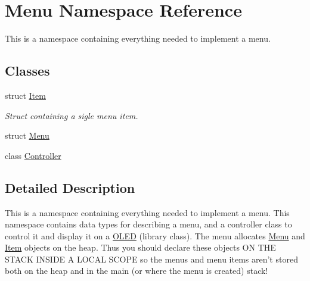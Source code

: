 \hypertarget{namespace_menu}{\section{Menu Namespace Reference}
\label{namespace_menu}
}


This is a namespace containing everything needed to implement a menu.  


\subsection*{Classes}
\begin{DoxyCompactItemize}
\item 
struct \hyperlink{struct_menu_1_1_item}{Item}
\begin{DoxyCompactList}\small\item\em Struct containing a sigle menu item. \end{DoxyCompactList}\item 
struct \hyperlink{struct_menu_1_1_menu}{Menu}
\item 
class \hyperlink{class_menu_1_1_controller}{Controller}
\end{DoxyCompactItemize}


\subsection{Detailed Description}
This is a namespace containing everything needed to implement a menu. This namespace contains data types for describing a menu, and a controller class to control it and display it on a \hyperlink{class_o_l_e_d}{O\-L\-E\-D} (library class). The menu allocates \hyperlink{namespace_menu}{Menu} and \hyperlink{struct_menu_1_1_item}{Item} objects on the heap. Thus you should declare these objects O\-N T\-H\-E S\-T\-A\-C\-K I\-N\-S\-I\-D\-E A L\-O\-C\-A\-L S\-C\-O\-P\-E so the menus and menu items aren't stored both on the heap and in the main (or where the menu is created) stack! 